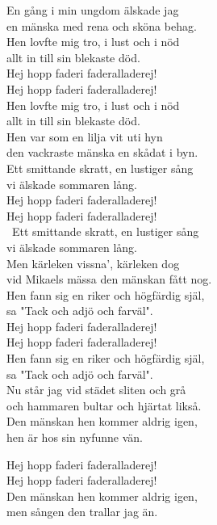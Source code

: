 \documentclass[a6paper, 10pt, twoside]{article}
\begin{document}
\begin{center}
\end{center}
\begin{lyrics}
En gång i min ungdom älskade jag\\
en mänska med rena och sköna behag.\\
Hen lovfte mig tro, i lust och i nöd\\
allt in till sin blekaste död.
\vspace{5pt}\\
Hej hopp faderi faderalladerej!\\
Hej hopp faderi faderalladerej!\\
Hen lovfte mig tro, i lust och i nöd\\
allt in till sin blekaste död.
\vspace{5pt}\\
Hen var som en lilja vit uti hyn\\
den vackraste mänska en skådat i byn.\\
Ett smittande skratt, en lustiger sång\\
vi älskade sommaren lång.
\vspace{5pt}\\
Hej hopp faderi faderalladerej!\\
Hej hopp faderi faderalladerej!\\\
Ett smittande skratt, en lustiger sång\\
vi älskade sommaren lång.
\vspace{5pt}\\
Men kärleken vissna', kärleken dog\\
vid Mikaels mässa den mänskan fått nog.\\
Hen fann sig en riker och högfärdig själ,\\
sa "Tack och adjö och farväl".
\vspace{5pt}\\
Hej hopp faderi faderalladerej!\\
Hej hopp faderi faderalladerej!\\
Hen fann sig en riker och högfärdig själ,\\
sa "Tack och adjö och farväl".
\vspace{5pt}\\
Nu står jag vid städet sliten och grå\\
och hammaren bultar och hjärtat likså.\\
Den mänskan hen kommer aldrig igen,\\
hen är hos sin nyfunne vän.

\newpage
\noindent
Hej hopp faderi faderalladerej!\\
Hej hopp faderi faderalladerej!\\
Den mänskan hen kommer aldrig igen,\\
men sången den trallar jag än. 
\end{lyrics}
\end{document}
